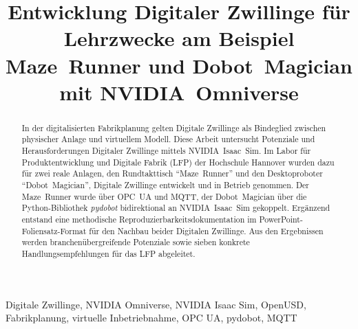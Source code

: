 \documentclass[conference]{IEEEtran}
\begin{document}
\title{Entwicklung Digitaler Zwillinge für Lehrzwecke am Beispiel Maze~Runner und Dobot~Magician mit NVIDIA~Omniverse}

\author{
}

\maketitle

\begin{abstract}
In der digitalisierten Fabrikplanung gelten Digitale Zwillinge als Bindeglied zwischen physischer Anlage und virtuellem Modell.
Diese Arbeit untersucht Potenziale und Herausforderungen Digitaler Zwillinge mittels NVIDIA~Isaac~Sim.
Im Labor für Produktentwicklung und Digitale Fabrik (LFP) der Hochschule Hannover wurden dazu für zwei reale Anlagen, den Rundtakttisch \enquote{Maze~Runner} und den Desktoproboter \enquote{Dobot~Magician}, Digitale Zwillinge entwickelt und in Betrieb genommen.
Der Maze~Runner wurde über OPC~UA und MQTT, der Dobot~Magician über die Python-Bibliothek \emph{pydobot} bidirektional an NVIDIA~Isaac~Sim gekoppelt.
Ergänzend entstand eine methodische Reproduzierbarkeitsdokumentation im PowerPoint-Foliensatz-Format für den Nachbau beider Digitalen Zwillinge.
Aus den Ergebnissen werden branchenübergreifende Potenziale sowie sieben konkrete Handlungsempfehlungen für das LFP abgeleitet.
\end{abstract}

\begin{IEEEkeywords}
Digitale Zwillinge, NVIDIA Omniverse, NVIDIA Isaac Sim, OpenUSD, Fabrikplanung, virtuelle Inbetriebnahme, OPC UA, pydobot, MQTT
\end{IEEEkeywords}
\end{document}
